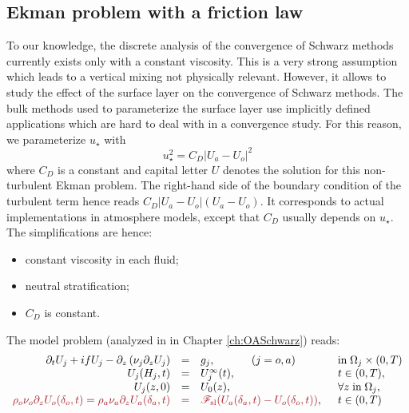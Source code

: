 \subsection{Ekman problem with a friction law}
\label{sec:airseaSCM_hierarchy_Ekman}
To our knowledge, the discrete analysis of the convergence of Schwarz
methods currently exists only with a constant viscosity.
This is a very strong assumption
which leads to a vertical mixing not physically relevant.
However, it allows to study the effect of the surface layer on the
convergence of Schwarz methods.
The bulk methods used to parameterize the surface layer use
implicitly defined applications which are hard to deal with
in a convergence study. For this reason, we parameterize
$u_\star$ with
\begin{equation}
{u_\star^2} = C_D {|U_a - U_o|^2}
\end{equation}
where $C_D$ is a constant and capital letter $U$ denotes
the solution for this non-turbulent Ekman problem.
The right-hand side of the boundary condition of the
turbulent term hence reads
$C_D|U_a - U_o|(U_a - U_o)$. It corresponds to actual implementations
in atmosphere models, except that $C_D$ usually depends on $u_\star$.
The simplifications are hence:
\begin{itemize}
	\item constant viscosity in each fluid;
	\item neutral stratification;
	\item $C_D$ is constant.
\end{itemize}
The model problem (analyzed in in Chapter \ref{ch:OASchwarz}) reads:
\begin{equation}
\label{eq:cplProblem}
\begin{array}{rcll}
\partial_t U_j + i f U_j -
	\partial_z \left( \nu_j \partial_z U_j \right) &=& g_j,
~~~~~~~~~~ (j=o,a)
& \mbox{in}\;\Omega_j \times (0,T)\\
U_j(H_j,t) &=& U_j^\infty(t),  & t \in (0,T), \\ 
U_j(z,0) &=& U_0(z), & \forall z \; \mbox{in}\; \Omega_j, \\
	\emphase{\rho_o \nu_o \partial_z U_o(\delta_o,t) = \rho_a \nu_a \partial_z U_a(\delta_a,t)}
	&\emphase{=}&
	\emphase{{\cal F}_{\rm sl}( U_a(\delta_a,t)-U_o(\delta_o,t) )}, \;\; & t \in (0,T)
\end{array}
\end{equation}
